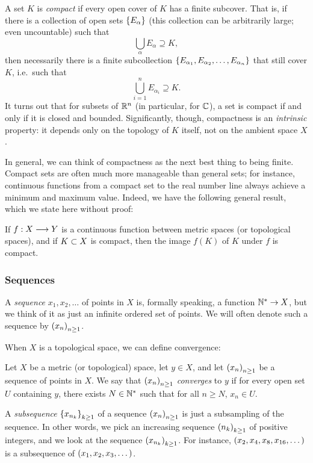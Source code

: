 \documentclass[twoside]{article}
\newcommand*{\1}{\mathbbm{1}}
\begin{document}
\begin{defn}
  A set \(K\) is \emph{compact} if every open cover of \(K\) has a finite subcover. That is, if there is a collection of open sets \(\set{E_\alpha}\) (this collection can be arbitrarily large; even uncountable) such that
  \[\bigcup_\alpha E_\alpha \supseteq K,\]
  then necessarily there is a finite subcollection \(\set{E_{\alpha_1},E_{\alpha_2},\dots,E_{\alpha_n}}\) that still cover \(K\), i.e.\ such that
  \[\bigcup_{i=1}^n E_{\alpha_i} \supseteq K.\]
  It turns out that for subsets of \(\R^n\) (in particular, for \(\C\)), a set is compact if and only if it is closed and bounded. Significantly, though, compactness is an \emph{intrinsic} property: it depends only on the topology of \(K\) itself, not on the ambient space \(X\).
\end{defn}
In general, we can think of compactness as the next best thing to being finite. Compact sets are often much more manageable than general sets; for instance, continuous functions from a compact set to the real number line always achieve a minimum and maximum value. Indeed, we have the following general result, which we state here without proof:
\begin{thm}
  If \(f:X\lra Y\) is a continuous function between metric spaces (or topological spaces), and if \(K\ss X\) is compact, then the image \(f(K)\) of \(K\) under \(f\) is compact.
\end{thm}

\subsubsection{Sequences}
A \emph{sequence} \(x_1,x_2,\dots\) of points in \(X\) is, formally speaking, a function \(\N^* \ra X\), but we think of it as just an infinite ordered set of points. We will often denote such a sequence by \(\del{x_n}_{n\ge 1}\).

When \(X\) is a topological space, we can define convergence:

\begin{defn}
  Let \(X\) be a metric (or topological) space, let \(y\in X\), and let \(\del{x_n}_{n\ge 1}\) be a sequence of points in \(X\). We say that \(\del{x_n}_{n\ge 1}\) \emph{converges} to \(y\) if for every open set \(U\) containing \(y\), there exists \(N \in \N^*\) such that for all \(n\ge N\), \(x_n \in U\).
\end{defn}
A \emph{subsequence} \(\set{x_{n_k}}_{k\ge 1}\) of a sequence \(\del{x_n}_{n\ge 1}\) is just a subsampling of the sequence. In other words, we pick an increasing sequence \(\del{n_k}_{k\ge 1}\) of positive integers, and we look at the sequence \(\del{x_{n_k}}_{k\ge 1}\). For instance, \(\del{x_2,x_4,x_8,x_{16},\dots}\) is a subsequence of \(\del{x_1,x_2,x_3,\dots}\).
\end{document}
